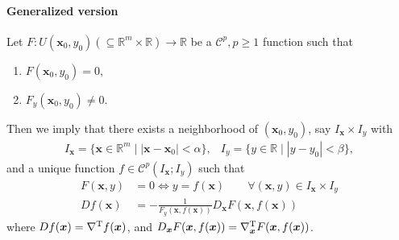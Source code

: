 \paragraph{Generalized version}
Let $F: U(\bm x_0,y_0)(\subseteq\mathbb{R}^m\times\mathbb{R})\to\mathbb{R}$ be a $\mathcal{C}^p,p\ge1$ function such that
\begin{enumerate}
\item
$F(\bm x_0,y_0)=0,$
\item
$F_y(\bm x_0,y_0)\ne0$.
\end{enumerate}
Then we imply that there exists a neighborhood of $(\bm x_0,y_0)$, say $I_{\bm x}\times I_y$ with
\[
\begin{array}{ll}
I_{\bm x}=\{\bm x\in\mathbb{R}^m\mid |\bm x-\bm x_0|<\alpha\},
&
I_y=\{y\in\mathbb{R}\mid |y-y_0|<\beta\},
\end{array}
\]
and a unique function $f\in\mathcal{C}^p(I_{\bm x};I_y)$ such that
\begin{align*}
F(\bm x,y)&=0\Longleftrightarrow
y = f(\bm x)\qquad \forall (\bm x,y)\in I_{\bm x}\times I_y\\
Df(\bm x)&=-\frac{1}{F_y(\bm x,f(\bm x))}D_{\bm x}F(\bm x,f(\bm x))
\end{align*}
where $Df(\bm x)=\nabla^{\mathrm T} f(\bm x)$, and $D_{\bm x}F(\bm x,f(\bm x))=\nabla_{\bm x}^{\mathrm T} F(\bm x,f(\bm x))$.

